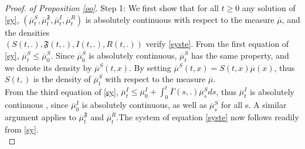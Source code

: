 \documentclass[notitlepage,reqno,11pt]{amsart}
\numberwithin{equation}{section}
\begin{document}
\begin{proof}\textit{of Proposition \ref{oo}}.
Step 1: We first show that for all $t\geq 0$ any solution of \eqref{sy}, $\left(\overline{\mu}^S_t,\overline{\mu}_t^{\mathfrak{F}},\overline{\mu}_t^{I},\overline{\mu}_t^{R}\right)$ is absolutely continuous with respect to the measure $\overline{\mu}$, and the densities\\ $\left(S(t,.), \mathfrak{F}(t,.), I(t,.) ,R(t,.)\right)$ verify \eqref{syste}.
 From the first equation of \eqref{sy}, $\overline{\mu}^S_t\leq \overline{\mu}^S_0$. Since $\overline{\mu}^S_0$ is absolutely continuous,  $\overline{\mu}^S_t$ has the same property, and we denote its density by $\overline{\mu}^S(t,x)$. By setting $\overline{\mu}^S(t,x)= S(t,x)\overline{\mu}(x)$, thus $S(t,)$ is the density of $\overline{\mu}^S_t$ with respect to the measure $\overline{\mu}$.\\ 
From the third equation of \eqref{sy}, $\displaystyle \overline{\mu}_t^{I}\leq  \overline{\mu}_0^{I}+ \int_0^t \overline{\Gamma}(s,.)\overline{\mu}^{S}_sds$, thus $\overline{\mu}_t^{I}$ is absolutely continuous , since $\overline{\mu}^I_0$ is absolutely continuous, as well as $\overline{\mu}^{S}_s$ for all s. 
A similar argument applies  to $ \overline{\mu}_t^{\mathfrak{F}}$ and $ \overline{\mu}_t^{R}$.The system of equation \eqref{syste} now follows readily from \eqref{sy}.\\
\smallskip


\end{proof}
\end{document}
